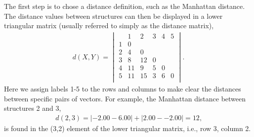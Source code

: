 The  first  step  is to  chose  a  distance  definition, such  as  the
Manhattan distance.   The distance values between  structures can then
be displayed in a lower  triangular matrix (usually referred to simply
as the distance matrix),
\begin{gather} 
d(X, Y)=
\begin{vmatrix}
   & 1  &  2   & 3 & 4 & 5 \\
1  & 0  &      &   &   &   \\
2  & 4  &  0   &   &   &   \\
3  & 8  & 12   & 0 &   &   \\
4  & 11 &  9   & 5 & 0 &   \\
5  & 11 & 15   & 3 & 6 & 0 \\
\end{vmatrix} .
\label{eq:man}
\end{gather}
Here we  assign labels 1-5 to the  rows and columns to  make clear the
distances  between  specific  pairs   of  vectors.  For  example,  the
Manhattan distance between structures 2 and 3,
\begin{gather}
d(2, 3)= |-2.00 - 6.00| + |2.00 - -2.00| = 12 \text{,}
\end{gather}
is found  in the (3,2) element  of the lower  triangular matrix, i.e.,
row 3, column 2.

